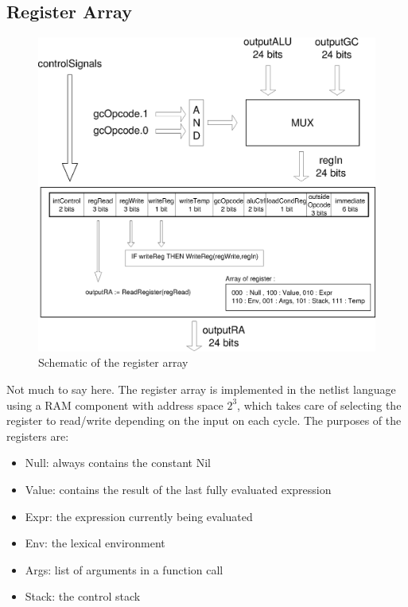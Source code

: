 \documentclass[a4paper, 11pt]{article}
\begin{document}
\newpage
\subsection{Register Array}
\begin{figure}[h]
\center
\caption{Schematic of the register array}
   \includegraphics[scale=0.5]{RA.eps}
\end{figure}

Not much to say here. The register array is implemented in the netlist language using a RAM component with address space $2^3$, which takes care of selecting the register to read/write depending on the input on each cycle. The purposes of the registers are:
\begin{itemize}
\item Null: always contains the constant Nil
\item Value: contains the result of the last fully evaluated expression
\item Expr: the expression currently being evaluated
\item Env: the lexical environment
\item Args: list of arguments in a function call
\item Stack: the control stack
\end{itemize}


\newpage
\end{document}
